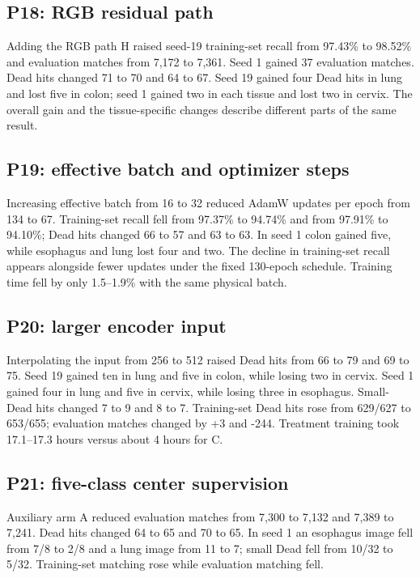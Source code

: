 \documentclass[11pt]{article}
\begin{document}
\subsection{P18: RGB residual path}
Adding the RGB path H raised seed-19 training-set recall from 97.43\% to 98.52\% and evaluation matches from 7,172 to 7,361. Seed 1 gained 37 evaluation matches. Dead hits changed 71 to 70 and 64 to 67. Seed 19 gained four Dead hits in lung and lost five in colon; seed 1 gained two in each tissue and lost two in cervix. The overall gain and the tissue-specific changes describe different parts of the same result.

\subsection{P19: effective batch and optimizer steps}
Increasing effective batch from 16 to 32 reduced AdamW updates per epoch from 134 to 67. Training-set recall fell from 97.37\% to 94.74\% and from 97.91\% to 94.10\%; Dead hits changed 66 to 57 and 63 to 63. In seed 1 colon gained five, while esophagus and lung lost four and two. The decline in training-set recall appears alongside fewer updates under the fixed 130-epoch schedule. Training time fell by only 1.5--1.9\% with the same physical batch.

\subsection{P20: larger encoder input}
Interpolating the input from 256 to 512 raised Dead hits from 66 to 79 and 69 to 75. Seed 19 gained ten in lung and five in colon, while losing two in cervix. Seed 1 gained four in lung and five in cervix, while losing three in esophagus. Small-Dead hits changed 7 to 9 and 8 to 7. Training-set Dead hits rose from 629/627 to 653/655; evaluation matches changed by +3 and -244. Treatment training took 17.1--17.3 hours versus about 4 hours for C.

\subsection{P21: five-class center supervision}
Auxiliary arm A reduced evaluation matches from 7,300 to 7,132 and 7,389 to 7,241. Dead hits changed 64 to 65 and 70 to 65. In seed 1 an esophagus image fell from 7/8 to 2/8 and a lung image from 11 to 7; small Dead fell from 10/32 to 5/32. Training-set matching rose while evaluation matching fell.
\end{document}

